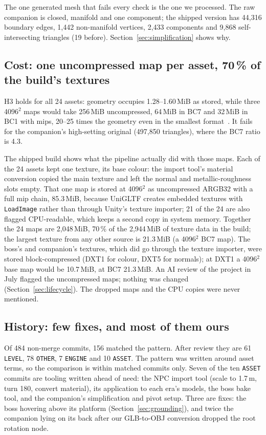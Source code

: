 The one generated mesh that fails every check is the one we processed. The raw
companion is closed, manifold and one component; the shipped version has 44,316
boundary edges, 1,442 non-manifold vertices, 2,433 components and 9,868
self-intersecting triangles (19 before). Section~\ref{sec:simplification} shows
why.

\subsection{Cost: one uncompressed map per asset, 70\,\% of the build's textures}
\label{sec:cost}

H3 holds for all 24 assets: geometry occupies 1.28--1.60\,MiB as stored, while
three 4096$^2$ maps would take 256\,MiB uncompressed, 64\,MiB in BC7 and 32\,MiB
in BC1 with mips, 20--25 times the geometry even in the smallest
format~\cite{akenine2018rtr4,microsoft_bc7}. It fails for the companion's
high-setting original (497,850 triangles), where the BC7 ratio is 4.3.

The shipped build shows what the pipeline actually did with those maps. Each of
the 24 assets kept one texture, its base colour: the import tool's material
conversion copied the main texture and left the normal and metallic-roughness
slots empty. That one map is stored at 4096$^2$ as uncompressed ARGB32 with a
full mip chain, 85.3\,MiB, because UniGLTF creates embedded textures with
\texttt{LoadImage} rather than through Unity's texture importer; 21 of the 24 are
also flagged CPU-readable, which keeps a second copy in system memory. Together
the 24 maps are 2,048\,MiB, 70\,\% of the 2,944\,MiB of texture data in the
build; the largest texture from any other source is 21.3\,MiB (a 4096$^2$ BC7
map). The boss's and companion's textures, which did go through the texture
importer, were stored block-compressed (DXT1 for colour, DXT5 for normals); at
DXT1 a 4096$^2$ base map would be 10.7\,MiB, at BC7 21.3\,MiB. An AI review of
the project in July flagged the uncompressed maps; nothing was changed
(Section~\ref{sec:lifecycle}). The dropped maps and the CPU copies were never
mentioned.



\subsection{History: few fixes, and most of them ours}
\label{sec:history}

Of 484 non-merge commits, 156 matched the pattern. After review they are 61
\texttt{LEVEL}, 78 \texttt{OTHER}, 7 \texttt{ENGINE} and 10 \texttt{ASSET}. The
pattern was written around asset terms, so the comparison is within matched
commits only. Seven of the ten \texttt{ASSET} commits are tooling written ahead of
need: the NPC import tool (scale to 1.7\,m, turn 180\textdegree, convert
material), its application to each era's models, the boss bake tool, and the
companion's simplification and pivot setup. Three are fixes: the boss hovering
above its platform (Section~\ref{sec:grounding}), and twice the companion lying on
its back after our GLB-to-OBJ conversion dropped the root rotation node.

